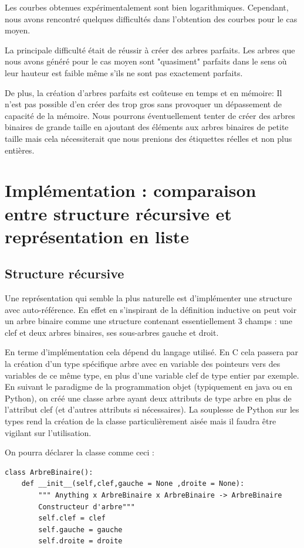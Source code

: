 \documentclass{report}
\begin{document}
Les courbes obtenues expérimentalement sont bien logarithmiques.
Cependant, nous avons rencontré quelques difficultés dans l'obtention des courbes pour le cas moyen. 

La principale difficulté était de réussir à créer des arbres parfaits. Les arbres que nous avons généré pour le cas moyen sont "quasiment" parfaits dans le sens où leur hauteur est faible même s'ils ne sont pas exactement parfaits.

De plus, la création d'arbres parfaits est coûteuse en temps et en mémoire: Il n'est pas possible d'en créer des trop gros sans provoquer un dépassement de capacité de la mémoire.
Nous pourrons éventuellement tenter de créer des arbres binaires de grande taille en ajoutant des éléments aux arbres binaires de petite taille mais cela nécessiterait que nous prenions des étiquettes réelles et non plus entières. 


\section{Implémentation : comparaison entre structure récursive et représentation en liste}
\subsection{Structure récursive}
Une représentation qui semble la plus naturelle est d'implémenter une structure avec auto-référence. En effet en s'inspirant de la définition inductive on peut voir un arbre binaire comme une structure contenant essentiellement 3 champs : une clef et deux arbres binaires, ses sous-arbres gauche et droit. 

En terme d'implémentation cela dépend du langage utilisé. 
En C cela passera par la création d'un type spécifique arbre avec en variable des pointeurs vers des variables de ce même type, en plus d'une variable clef de type entier par exemple. 
En suivant le paradigme de la programmation objet (typiquement en java ou en Python), on créé une classe arbre ayant deux attributs de type arbre en plus de l'attribut clef (et d'autres attributs si nécessaires). La souplesse de Python sur les types rend la création de la classe particulièrement aisée mais il faudra être vigilant sur l'utilisation. 

On pourra déclarer la classe comme ceci :

\begin{lstlisting}
class ArbreBinaire():
    def __init__(self,clef,gauche = None ,droite = None):
        """ Anything x ArbreBinaire x ArbreBinaire -> ArbreBinaire
        Constructeur d'arbre"""
        self.clef = clef
        self.gauche = gauche
        self.droite = droite
\end{lstlisting}
\end{document}
